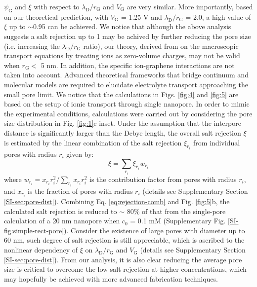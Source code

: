 \documentclass[journal=nalefd,email=true, hyperref=true, keywords=false]{achemso}
\newcommand{\Fig}{Fig.}
\begin{document}
$\psi_{\mathrm{G}}$ and $\xi$ with respect to
$\lambda_{\mathrm{D}}/r_{\mathrm{G}}$ and $V_{\mathrm{G}}$ are very
similar. More importantly, based on our theoretical prediction, with
$V_{\mathrm{G}}$ = 1.25 V and $\lambda_{\mathrm{D}} / r_{\mathrm{G}}$
= { 2.0},
a high value of $\xi$ up to $\sim$0.95 can be achieved.  We
notice that although the above analysis suggests a salt rejection up
to 1 may be achived by further reducing the pore size (i.e. increasing
the $\lambda_{\mathrm{D}}/r_{\mathrm{G}}$ ratio), our theory, derived
from on the macroscopic transport equations by treating ions as
zero-volume charges, may not be valid when $r_{\mathrm{G}}<$ 5
nm\cite{Jain_2015}. In addition, the specific ion-graphene
interactions \cite{Rollings_2016} are not taken into account. Advanced
theoretical frameworks that bridge continuum and molecular models are
required to elucidate electrolyte transport approaching the small pore
limit. 
{
We notice that the calculations in Figs. \ref{fig:4} and \ref{fig:5} 
are based on the setup  of ionic transport through single nanopore.
In order to mimic the experimental conditions, 
calculations were carried out by considering the pore size distribution in Fig. \ref{fig:1}c inset. 
Under the assumption that the interpore distance is significantly larger than the Debye length,
the overall salt rejection $\xi$ is
estimated by the linear combination of the salt rejection 
$\xi_{r_i}$ 
from individual pores with radius $r_i$ given by:
\begin{equation}
\label{eq:rejection-comb}
\xi = \sum_{r_{i}} \xi_{r_{i}} w_{r_{i}}
\end{equation}
where
$w_{r_{i}} = x_{r_{i}} r_{i}^{2} / \sum_{r_{i}} x_{r_{i}} r_{i}^{2} $
is the contribution factor from pores with radius $r_{i}$, and
$x_{r_{i}}$ is the fraction of pores with radius $r_{i}$ (details see
Supplementary Section \ref{SI-sec:pore-dist}). Combining
Eq. \ref{eq:rejection-comb} and \Fig{} \ref{fig:5}b, the calculated
salt rejection is reduced to $\sim{}$ 80\% of that from the
single-pore calculation of a 20 nm nanopore when $c_{0}$ = 0.1 mM
(Supplementary \Fig{} \ref{SI-fig:simple-rect-pore}). Consider the
existence of large pores with diameter up to 60 nm, such degree of
salt rejection is still appreciable, which is ascribed to the
nonlinear dependency of $\xi$ on
$\lambda_{\mathrm{D}} / r_{\mathrm{G}}$ and $V_{\mathrm{G}}$ (details
see Supplementary Section \ref{SI-sec:pore-dist}).}  From our
analysis, it is also clear reducing the average pore size is critical
to overcome the low salt rejection at higher concentrations, which may
hopefully be achieved with more advanced fabrication techniques.
\end{document}
